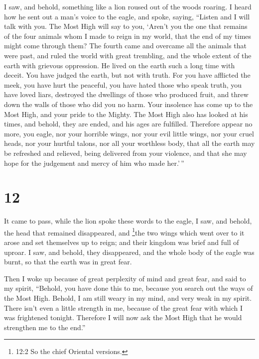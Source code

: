  I saw, and behold, something like a lion roused out of the
woods roaring. I heard how he sent out a man's voice to the eagle, and
spoke, saying,  ``Listen and I will talk with you. The Most
High will say to you,  `Aren't you the one that remains of
the four animals whom I made to reign in my world, that the end of my
times might come through them?  The fourth came and
overcame all the animals that were past, and ruled the world with great
trembling, and the whole extent of the earth with grievous oppression.
He lived on the earth such a long time with deceit.  You
have judged the earth, but not with truth.  For you have
afflicted the meek, you have hurt the peaceful, you have hated those who
speak truth, you have loved liars, destroyed the dwellings of those who
produced fruit, and threw down the walls of those who did you no harm.
 Your insolence has come up to the Most High, and your
pride to the Mighty.  The Most High also has looked at his
times, and behold, they are ended, and his ages are fulfilled.
 Therefore appear no more, you eagle, nor your horrible
wings, nor your evil little wings, nor your cruel heads, nor your
hurtful talons, nor all your worthless body,  that all the
earth may be refreshed and relieved, being delivered from your violence,
and that she may hope for the judgement and mercy of him who made
her.'\,''

\hypertarget{section-11}{%
\section{12}\label{section-11}}

 It came to pass, while the lion spoke these words to the
eagle, I saw,  and behold, the head that remained
disappeared, and \footnote{12:2 So the chief Oriental versions.}the two
wings which went over to it arose and set themselves up to reign; and
their kingdom was brief and full of uproar.  I saw, and
behold, they disappeared, and the whole body of the eagle was burnt, so
that the earth was in great fear.

Then I woke up because of great perplexity of mind and great fear, and
said to my spirit,  ``Behold, you have done this to me,
because you search out the ways of the Most High.  Behold, I
am still weary in my mind, and very weak in my spirit. There isn't even
a little strength in me, because of the great fear with which I was
frightened tonight.  Therefore I will now ask the Most High
that he would strengthen me to the end.''

